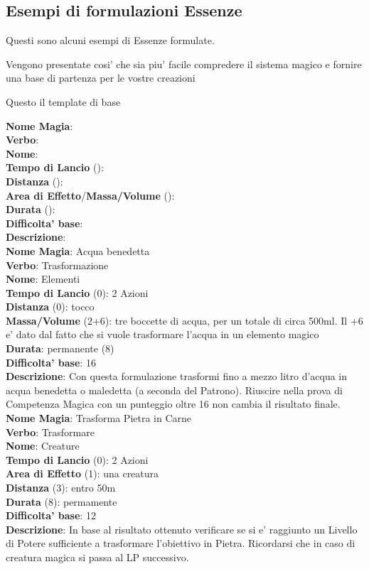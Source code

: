 \subsection{Esempi di formulazioni Essenze}

Questi sono alcuni esempi di Essenze formulate.

Vengono presentate cosi' che sia piu' facile compredere il sistema magico e fornire una base di partenza per le vostre creazioni


Questo il template di base


\flushleft \textbf{Nome Magia}: \\ 
\textbf{Verbo}: \\
\textbf{Nome}: \\
\textbf{Tempo di Lancio} (): \\
\textbf{Distanza} (): \\
\textbf{Area di Effetto}/\textbf{Massa/Volume} (): \\
\textbf{Durata} (): \\
\textbf{Difficolta' base}: \\
\textbf{Descrizione}: \\


\flushleft \textbf{Nome Magia}: Acqua benedetta\\  
\textbf{Verbo}: Trasformazione\\
\textbf{Nome}: Elementi\\
\textbf{Tempo di Lancio} (0): 2 Azioni\\
\textbf{Distanza} (0): tocco\\
\textbf{Massa/Volume} (2+6): tre boccette di acqua, per un totale di circa 500ml. Il +6 e' dato dal fatto che si vuole trasformare l'acqua in un elemento magico\\
\textbf{Durata}: permanente (8)\\
\textbf{Difficolta' base}: 16\\
\textbf{Descrizione}: Con questa formulazione trasformi fino a mezzo litro d'acqua in acqua benedetta o maledetta (a seconda del Patrono). Riuscire nella prova di Competenza Magica con un punteggio oltre 16 non cambia il risultato finale.\\


\flushleft \textbf{Nome Magia}: Trasforma Pietra in Carne \\ 
\textbf{Verbo}: Trasformare\\
\textbf{Nome}: Creature\\
\textbf{Tempo di Lancio} (0): 2 Azioni\\
\textbf{Area di Effetto} (1): una creatura\\
\textbf{Distanza} (3): entro 50m\\
\textbf{Durata} (8): permamente\\
\textbf{Difficolta' base}: 12 \\
\textbf{Descrizione}: In base al risultato ottenuto verificare se si e' raggiunto un Livello di Potere sufficiente a trasformare l'obiettivo in Pietra.
Ricordarsi che in caso di creatura magica si passa al LP successivo.\\


